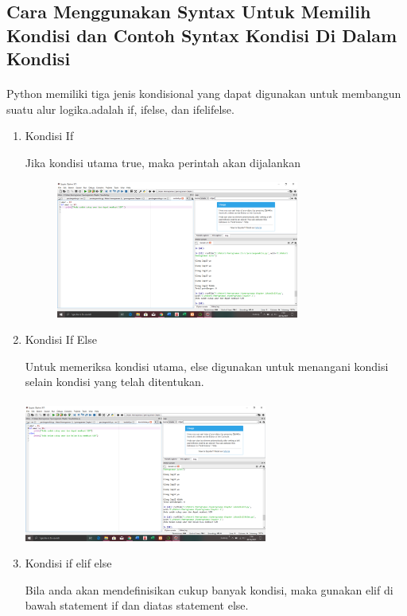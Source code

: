 \documentclass{article}
\begin{document}
\subsection{Cara Menggunakan Syntax Untuk Memilih Kondisi dan Contoh Syntax Kondisi Di Dalam Kondisi}
\paragraph{}
        Python memiliki tiga jenis kondisional yang dapat digunakan untuk membangun suatu alur logika.adalah  if, ifelse, dan ifelifelse. 
\begin{enumerate}
    \item Kondisi If
    \par Jika kondisi utama true, maka perintah akan dijalankan
    \begin{figure}[h]
        \centerline{\includegraphics[width=8cm]{figures/kondisiif.png}}
    \end{figure}
    \item Kondisi If Else
    \par Untuk memeriksa kondisi utama, else digunakan untuk menangani kondisi selain kondisi yang telah ditentukan.
    \paragraph{}
    \centerline{\includegraphics[width=8cm]{figures/kondisiifelse.png}}
    \item Kondisi if elif else
    \par Bila anda akan mendefinisikan cukup banyak kondisi, maka gunakan elif di bawah statement if dan diatas statement else.
  

\end{enumerate}
\end{document}
